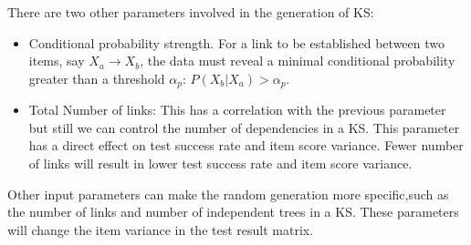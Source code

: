 There are two other parameters involved in the generation of KS:
\begin{itemize}
\item Conditional probability strength.  For a link to be established between two items, say $X_a \rightarrow X_b$, the data must reveal a minimal conditional probability greater than a threshold $\alpha_p$: $P(X_b|X_a) > \alpha_p$.
\item %
Total Number of links: This has a correlation with the previous parameter but still we can control the number of dependencies in a KS. This parameter has a direct effect on test success rate and item score variance. Fewer number of links will result in lower test success rate and item score variance.%
\end{itemize}
Other input parameters can make the random generation more specific,such as the number of links and number of independent trees in a KS. These parameters will change the item variance in the test result matrix. 

